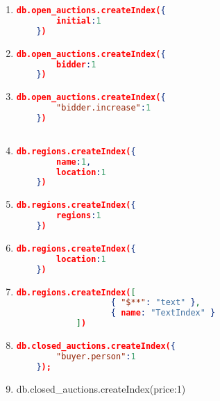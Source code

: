\begin{enumerate}[label=I\arabic*]
\item \label{mongodb-i-1}
\begin{lstlisting}[language=JSON,  basicstyle=\scriptsize]
   db.open_auctions.createIndex({
		initial:1
	})
\end{lstlisting}

\item \label{mongodb-i-2}
\begin{lstlisting}[language=JSON,  basicstyle=\scriptsize]
  	db.open_auctions.createIndex({
		bidder:1
	})
\end{lstlisting}

\item \label{mongodb-i-3}
\begin{lstlisting}[language=JSON]
  	db.open_auctions.createIndex({
		"bidder.increase":1
	})
	
\end{lstlisting}

\item \label{mongodb-i-4}
\begin{lstlisting}[language=JSON]
  	db.regions.createIndex({
		name:1,
		location:1
	})
\end{lstlisting}

\item \label{mongodb-i-5}
\begin{lstlisting}[language=JSON]
  db.regions.createIndex({
		regions:1
	})

\end{lstlisting}


\item \label{mongodb-i-6}
\begin{lstlisting}[language=JSON]
  	db.regions.createIndex({
		location:1
	})
\end{lstlisting}


\item \label{mongodb-i-7}
\begin{lstlisting}[language=JSON]
  	db.regions.createIndex([
                   { "$**": "text" },
                   { name: "TextIndex" }
            ])

\end{lstlisting}


\item \label{mongodb-i-8}
\begin{lstlisting}[language=JSON]
   	db.closed_auctions.createIndex({
		"buyer.person":1
	});
\end{lstlisting}


\item \label{mongodb-i-9}
\begin{fakeJSON}
  db.closed_auctions.createIndex({price:1})
\end{fakeJSON}


\end{enumerate}